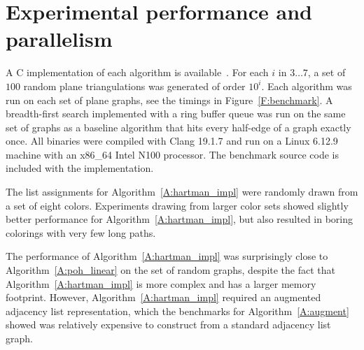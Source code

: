 \documentclass[12pt,letterpaper]{article}
\theoremstyle{plain}
\theoremstyle{definition}
\theoremstyle{break}
\begin{document}
\section{Experimental performance and parallelism}

A C implementation of each algorithm is available~\cite{Bro2017}.
For each $i$ in $3\ldots 7$, a set of $100$ random plane triangulations was
generated of order $10^i$. Each algorithm was run on each set of plane graphs,
see the timings in Figure~\ref{F:benchmark}.
A breadth-first search implemented with
a ring buffer queue was run on the same set of graphs
as a baseline
algorithm that hits every half-edge of a graph exactly once.
All binaries 
were compiled with Clang 19.1.7 and run on a Linux 6.12.9 machine
with an x86\_64 Intel N100 processor.
The benchmark
source code is included with the implementation.

The list assignments for Algorithm~\ref{A:hartman_impl} were randomly
drawn from a set of eight colors. Experiments drawing from larger color sets
showed slightly better performance for Algorithm~\ref{A:hartman_impl}, but also
resulted in boring colorings with very few long paths.

The performance of
Algorithm~\ref{A:hartman_impl} was surprisingly close to
Algorithm~\ref{A:poh_linear} on the set of random graphs, despite the fact that
Algorithm~\ref{A:hartman_impl} is more complex and has a larger memory
footprint.
However, Algorithm~\ref{A:hartman_impl} required an augmented adjacency list
representation, which the benchmarks for Algorithm~\ref{A:augment} showed
was relatively expensive to construct from a standard adjacency list graph.
\end{document}
